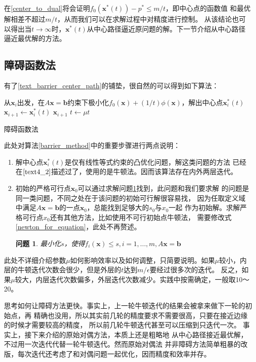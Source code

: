 \documentclass{article}
\newtheorem{problem}{问题}
\begin{document}
在\ref{center_to_dual}将会证明$f_0(\bm x^*(t))-p^*\le m/t$，即中心点的函数值
和最优解相差不超过$m/t$，从而我们可以在求解过程中对精度进行控制。
从该结论也可以得出当$t\rightarrow\infty$时，$\bm x^*(t)$从中心路径逼近原问题的解。下一节介绍从中心路径逼近最优解的方法。
\label{text_barrier_center_path}
\subsection{障碍函数法}
\label{text_barrier_method}
有了\ref{text_barrier_center_path}的铺垫，很自然的可以得到如下算法：

\renewcommand{\algorithmcfname}{算法}
\begin{algorithm}[H]
     {
        从$\bm x_i$出发，在$A\bm x=\bm b$约束下极小化$f_0(\bm x)+(1/t)\phi(\bm x)$，解出中心点$\bm x_i^*(t)$\;
        $\bm x_{i+1}\leftarrow\bm x_i^*(t)$\;
         {
            \Return $\bm x_{i+1}$
        }
        $t\leftarrow \mu t$
    }
    \caption{障碍函数法}
    \label{barrier_method}
\end{algorithm}

此处对算法\ref{barrier_method}中的重要步骤进行两点说明：
\begin{enumerate}
    \item 解中心点$\bm x_i^*(t)$是仅有线性等式约束的凸优化问题，解这类问题的方法
    已经在$\ref{text4_2}$描述过了，使用的是牛顿法。因而该算法存在内外两层迭代。
    \item 初始的严格可行点$\bm x_0$可以通过求解问题\ref{prepare}找到，此问题和我们要求解
    的问题是同一类问题，不同之处在于该问题的初始可行解很容易找，
    因为任取定义域中满足$A\bm x=\bm b$的一点$\bm x_0$，总能找到足够大的$s_0$与$x_0$一起
    作为初始解。求解严格可行点$x_0$还有其他方法，比如使用不可行初始点牛顿法，
    需要修改式\ref{newton_for_equation}，此处不再赘述。
    \begin{problem}
        最小化$s$，使得$f_i(\bm x)\le s,i=1,...,m,A\bm x=\bm b$
        \label{prepare}
    \end{problem}
\end{enumerate} 
此处不详细介绍参数$\mu$如何影响效率以及如何调整，只简要说明。如果$\mu$较小，内层的牛顿迭代次数会很少，但是外层的$t$达到$m/\epsilon$要经过很多次的迭代。
反之，如果$\mu$较大，内层迭代次数偏多，外层迭代次数减少。实践中按需确定，一般取10～20。

思考如何让障碍方法更快。事实上，上一轮牛顿迭代的结果会被拿来做下一轮的初始点，再
精确也没用，所以其实前几轮的精度要求不需要很高，只要在接近边缘的时候才需要较高的精度，
所以前几轮牛顿迭代甚至可以压缩到只迭代一次。
事实上，接下来\label{prim_dual_method}介绍的原始对偶方法，本质上还是粗略地
从中心路径接近最优解，不过用一次迭代代替一轮牛顿迭代。然而原始对偶法
并非障碍方法简单粗暴的改版，每次迭代还考虑了和对偶问题一起优化，因而精度和效率并存。
\end{document}

